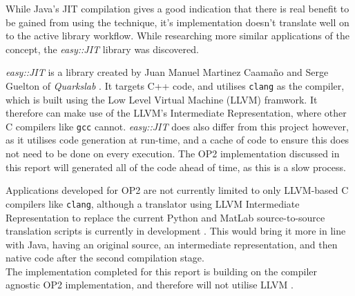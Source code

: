 While Java's JIT compilation gives a good indication that there is real benefit to be gained from using the technique, it's implementation doesn't translate well on to the active library workflow. While researching more similar applications of the concept, the \textit{easy::JIT} library was discovered.\\
\par
{} \textit{easy::JIT} \cite{eJIT} is a library created by Juan Manuel Martinez Caamaño and Serge Guelton of \textit{Quarkslab} \cite{Quarkslab}. It targets C++ code, and utilises \verb|clang| \cite{clang} as the compiler, which is built using the Low Level Virtual Machine (LLVM) framwork. It therefore can make use of the LLVM's Intermediate Representation, where other C compilers like \verb|gcc| cannot. \textit{easy::JIT} does also differ from this project however, as it utilises code generation at run-time, and a cache of code to ensure this does not need to be done on every execution. The OP2 implementation discussed in this report will generated all of the code ahead of time, as this is a slow process.
\par
Applications developed for OP2 are not currently limited to only LLVM-based C compilers like \verb|clang|, although a translator using LLVM Intermediate Representation to replace the current Python and MatLab source-to-source translation scripts is currently in development \cite{op2clang}. This would bring it more in line with Java, having an original source, an intermediate representation, and then native code after the second compilation stage.\\
The implementation completed for this report is building on the compiler agnostic OP2 implementation, and therefore will not utilise LLVM .
